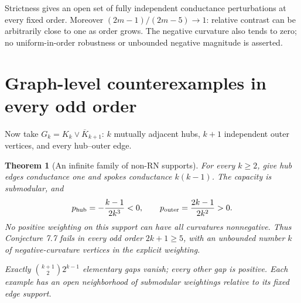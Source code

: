 \documentclass[11pt,a4paper]{article}
\newtheorem{theorem}{Theorem}
\begin{document}
Strictness gives an open set of fully independent conductance perturbations at every fixed order. Moreover $(2m-1)/(2m-5)\to1$: relative contrast can be arbitrarily close to one as order grows. The negative curvature also tends to zero; no uniform-in-order robustness or unbounded negative magnitude is asserted.

\section{Graph-level counterexamples in every odd order}
Now take $G_k=K_k\vee\overline{K}_{k+1}$: $k$ mutually adjacent hubs, $k+1$ independent outer vertices, and every hub--outer edge.

\begin{theorem}[An infinite family of non-RN supports]\label{thm:split}
For every $k\ge2$, give hub edges conductance one and spokes conductance $k(k-1)$. The capacity is submodular, and
\begin{equation}\label{eq:splitp}
p_{\rm hub}=-\frac{k-1}{2k^3}<0,\qquad
p_{\rm outer}=\frac{2k-1}{2k^2}>0.
\end{equation}
No positive weighting on this support can have all curvatures nonnegative. Thus Conjecture 7.7 fails in every odd order $2k+1\ge5$, with an unbounded number $k$ of negative-curvature vertices in the explicit weighting.

Exactly $\binom{k+1}{2}2^{k-1}$ elementary gaps vanish; every other gap is positive. Each example has an open neighborhood of submodular weightings relative to its fixed edge support.
\end{theorem}
\end{document}
